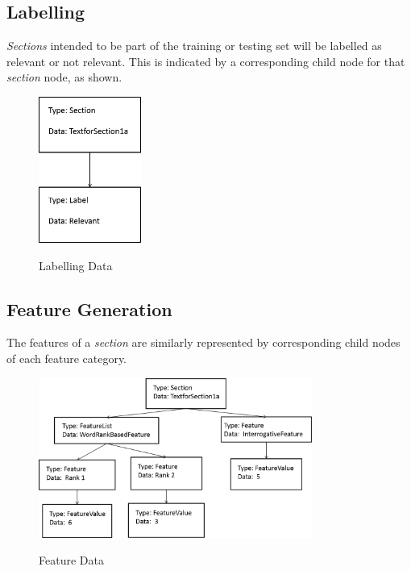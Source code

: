 \documentclass[a4paper,10pt]{report}
\begin{document}
\subsection{Labelling}

\emph{Sections} intended to be part of the training or testing set will be labelled as relevant or not relevant. This is indicated by a corresponding child node for that \emph{section} node, as shown.

\begin{figure}[h!]
\centering
\includegraphics[width=0.30\textwidth]{./diagrams/tree4}\\
\caption{Labelling Data}
\end{figure}

\clearpage

\subsection{Feature Generation}

The features of a \emph{section} are similarly represented by corresponding child nodes of each feature category. 

\begin{figure}[h!]
\centering
\includegraphics[width=0.80\textwidth]{./diagrams/tree5}\\
\caption{Feature Data}
\end{figure}
\end{document}
